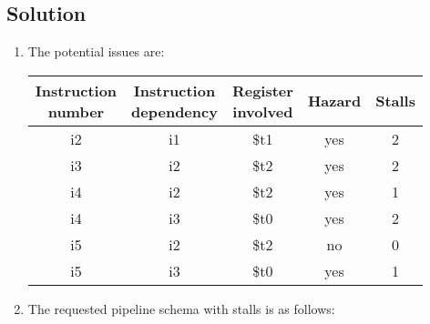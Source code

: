 \subsection*{Solution}
\begin{enumerate}
    \item The potential issues are:
        \begin{table}[H]
            \centering
            \begin{tabular}{ccccc}
            \hline
            \makecell{\textbf{Instruction} \\ \textbf{number}}& \makecell{\textbf{Instruction} \\ \textbf{dependency}} & \makecell{\textbf{Register} \\ \textbf{involved}} & \textbf{Hazard} & \textbf{Stalls} \\ \hline
            i2                         & i1                                 & \$t1                       & yes             & 2               \\
            i3                         & i2                                 & \$t2                       & yes             & 2               \\
            i4                         & i2                                 & \$t2                       & yes             & 1               \\
            i4                         & i3                                 & \$t0                       & yes             & 2               \\
            i5                         & i2                                 & \$t2                       & no              & 0               \\
            i5                         & i3                                 & \$t0                       & yes             & 1               \\ \hline
            \end{tabular}%
        \end{table}
    \item The requested pipeline schema with stalls is as follows:
        \begin{table}[H]
            \centering
\end{table}
\end{enumerate}
